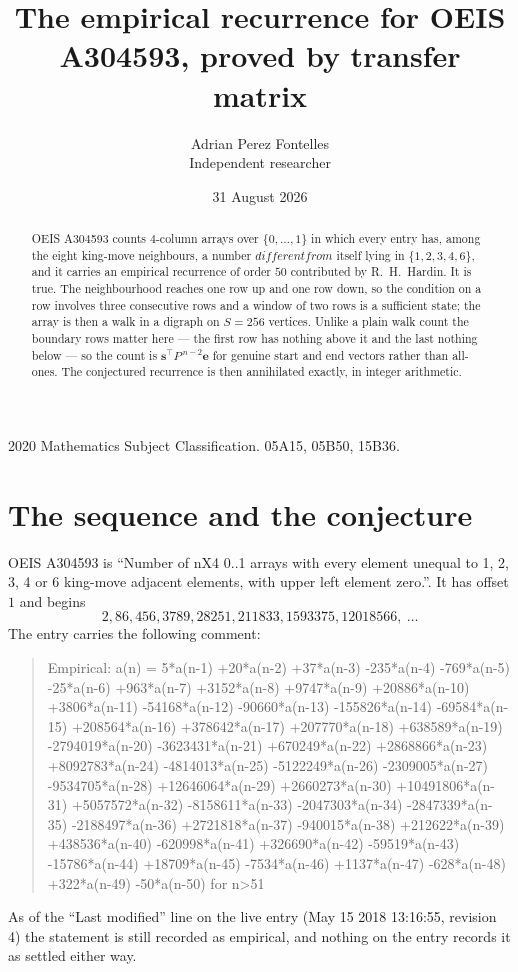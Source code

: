 \documentclass[11pt,a4paper]{article}
\title{The empirical recurrence for OEIS A304593, proved by transfer matrix}
\author{Adrian Perez Fontelles\\ \small Independent researcher}
\date{31 August 2026}
\theoremstyle{plain}
\theoremstyle{definition}
\begin{document}
\maketitle

\begin{abstract}
OEIS A304593 counts $4$-column arrays over $\{0,\dots,1\}$ in which every entry has,
among the eight king-move neighbours, a number $different from$ itself lying in $\{1,2,3,4,6\}$, and it carries an empirical
recurrence of order $50$ contributed by R.~H.~Hardin. It is true. The neighbourhood
reaches one row up and one row down, so the condition on a row involves three consecutive
rows and a window of two rows is a sufficient state; the array is then a walk in a digraph
on $S=256$ vertices. Unlike a plain walk count the boundary rows matter here --- the first
row has nothing above it and the last nothing below --- so the count is
$\mathbf{s}^{\!\top}P^{\,n-2}\mathbf{e}$ for genuine start and end vectors rather than
all-ones. The conjectured recurrence is then annihilated exactly, in integer arithmetic.
\end{abstract}

\noindent\small 2020 Mathematics Subject Classification. 05A15, 05B50, 15B36.\normalsize

\section{The sequence and the conjecture}

OEIS A304593 is ``Number of nX4 0..1 arrays with every element unequal to 1, 2, 3, 4 or 6 king-move adjacent elements, with upper left element zero.''. It has offset
$1$ and begins
\[
2, 86, 456, 3789, 28251, 211833, 1593375, 12018566,\ \dots
\]
The entry carries the following comment:
\begin{quote}\small
Empirical: a(n) = 5*a(n-1) +20*a(n-2) +37*a(n-3) -235*a(n-4) -769*a(n-5) -25*a(n-6) +963*a(n-7) +3152*a(n-8) +9747*a(n-9) +20886*a(n-10) +3806*a(n-11) -54168*a(n-12) -90660*a(n-13) -155826*a(n-14) -69584*a(n-15) +208564*a(n-16) +378642*a(n-17) +207770*a(n-18) +638589*a(n-19) -2794019*a(n-20) -3623431*a(n-21) +670249*a(n-22) +2868866*a(n-23) +8092783*a(n-24) -4814013*a(n-25) -5122249*a(n-26) -2309005*a(n-27) -9534705*a(n-28) +12646064*a(n-29) +2660273*a(n-30) +10491806*a(n-31) +5057572*a(n-32) -8158611*a(n-33) -2047303*a(n-34) -2847339*a(n-35) -2188497*a(n-36) +2721818*a(n-37) -940015*a(n-38) +212622*a(n-39) +438536*a(n-40) -620998*a(n-41) +326690*a(n-42) -59519*a(n-43) -15786*a(n-44) +18709*a(n-45) -7534*a(n-46) +1137*a(n-47) -628*a(n-48) +322*a(n-49) -50*a(n-50) for n>51
\end{quote}
As of the ``Last modified'' line on the live entry (May 15 2018 13:16:55, revision
4) the statement is still recorded as empirical, and nothing on the entry
records it as settled either way.
\end{document}
